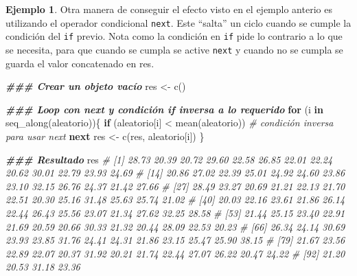 \documentclass[
]{article}
\newenvironment{Shaded}{\begin{snugshade}}{\end{snugshade}}
\newcommand{\CommentTok}[1]{\textcolor[rgb]{0.56,0.35,0.01}{\textit{#1}}}
\newcommand{\ControlFlowTok}[1]{\textcolor[rgb]{0.13,0.29,0.53}{\textbf{#1}}}
\newcommand{\DocumentationTok}[1]{\textcolor[rgb]{0.56,0.35,0.01}{\textbf{\textit{#1}}}}
\newcommand{\FunctionTok}[1]{\textcolor[rgb]{0.00,0.00,0.00}{#1}}
\newcommand{\NormalTok}[1]{#1}
\newcommand{\OtherTok}[1]{\textcolor[rgb]{0.56,0.35,0.01}{#1}}
\newcommand{\SpecialCharTok}[1]{\textcolor[rgb]{0.00,0.00,0.00}{#1}}
\theoremstyle{definition}
\theoremstyle{definition}
\newtheorem{example}{Ejemplo}[section]
\theoremstyle{definition}
\theoremstyle{definition}
\theoremstyle{remark}
\begin{document}
\begin{example}

Otra manera de conseguir el efecto visto en el ejemplo anterio es utilizando el operador condicional \texttt{next}. Este ``salta'' un ciclo cuando se cumple la condición del \texttt{if} previo. Nota como la condición en \texttt{if} pide lo contrario a lo que se necesita, para que cuando se cumpla se active \texttt{next} y cuando no se cumpla se guarda el valor concatenado en res.

\begin{Shaded}
\begin{Highlighting}[]
\DocumentationTok{\#\#\# Crear un objeto vacío }
\NormalTok{res }\OtherTok{\textless{}{-}} \FunctionTok{c}\NormalTok{()}

\DocumentationTok{\#\#\# Loop con next y condición if inversa a lo requerido}
\ControlFlowTok{for}\NormalTok{ (i }\ControlFlowTok{in} \FunctionTok{seq\_along}\NormalTok{(aleatorio))\{}
  \ControlFlowTok{if}\NormalTok{ (aleatorio[i] }\SpecialCharTok{\textless{}} \FunctionTok{mean}\NormalTok{(aleatorio)) }\CommentTok{\# condición inversa para usar next}
    \ControlFlowTok{next}
\NormalTok{  res }\OtherTok{\textless{}{-}} \FunctionTok{c}\NormalTok{(res, aleatorio[i])}
\NormalTok{\}}

\DocumentationTok{\#\#\# Resultado}
\NormalTok{res}
\CommentTok{\#  [1] 28.73 20.39 20.72 29.60 22.58 26.85 22.01 22.24 20.62 30.01 22.79 23.93 24.69}
\CommentTok{\# [14] 20.86 27.02 22.39 25.01 24.92 24.60 23.86 23.10 32.15 26.76 24.37 21.42 27.66}
\CommentTok{\# [27] 28.49 23.27 20.69 21.21 22.13 21.70 22.51 20.30 25.16 31.48 25.63 25.74 21.02}
\CommentTok{\# [40] 20.03 22.16 23.61 21.86 26.14 22.44 26.43 25.56 23.07 21.34 27.62 32.25 28.58}
\CommentTok{\# [53] 21.44 25.15 23.40 22.91 21.69 20.59 20.66 30.33 21.32 20.44 28.09 22.53 20.23}
\CommentTok{\# [66] 26.34 24.14 30.69 23.93 23.85 31.76 24.41 24.31 21.86 23.15 25.47 25.90 38.15}
\CommentTok{\# [79] 21.67 23.56 22.89 22.07 20.37 31.92 20.21 21.74 22.44 27.07 26.22 20.47 24.22}
\CommentTok{\# [92] 21.20 20.53 31.18 23.36}
\end{Highlighting}
\end{Shaded}

\end{example}
\end{document}
